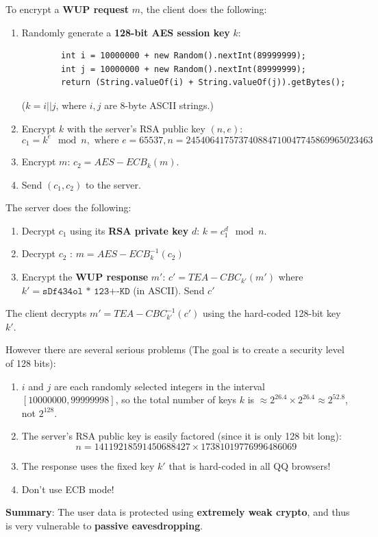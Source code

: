 \documentclass[12pt,titlepage]{article}
\begin{document}
To encrypt a \textbf{WUP request} $m$, the client does the following:\begin{enumerate}
	\item Randomly generate a \textbf{128-bit AES session key} $k$:\begin{verbatim}
		int i = 10000000 + new Random().nextInt(89999999);
		int j = 10000000 + new Random().nextInt(89999999);
		return (String.valueOf(i) + String.valueOf(j)).getBytes();
	\end{verbatim}
	($k = i||j$, where $i, j$ are 8-byte ASCII strings.)
	\item Encrypt $k$ with the server’s RSA public key $(n, e)$: $$c_1 = k^e \mod n, \text{ where } e = 65537, n=245406417573740884710047745869965023463$$
	\item Encrypt $m$: $c_2 = AES-ECB_k (m)$.
	\item Send $(c_1 , c_2 )$ to the server.
\end{enumerate}
The server does the following:\begin{enumerate}
	\item Decrypt $c_1$ using its \textbf{RSA private key} $d$: $k = c_1^d \mod n$.
	\item Decrypt $c_2$ : $m = AES-ECB^{-1}_k (c_2)$
	\item Encrypt the \textbf{WUP response} $m'$: $c' = TEA-CBC_{k'}(m')$ where $k' = \texttt{sDf434ol * 123+-KD}$ (in ASCII). Send $c'$
\end{enumerate}

The client decrypts $m'= TEA-CBC^{-1}_{k'} (c')$ using the hard-coded 128-bit key $k'$.

However there are several serious problems (The goal is to create a security level of 128 bits): \begin{enumerate}
	\item $i$ and $j$ are each randomly selected integers in the interval $[10000000, 99999998]$, so the total number of keys $k$ is $\approx 2^{26.4} \times 2^{26.4} \approx 2^{52.8}$, not $2^{128}$. 
	\item The server’s RSA public key is easily factored (since it is only 128 bit long):$$n = 14119218591450688427 \times 17381019776996486069$$
	\item The response uses the fixed key $k'$ that is hard-coded in all QQ browsers!
	\item Don’t use ECB mode!
\end{enumerate}

\textbf{Summary}: The user data is protected using \textbf{extremely weak crypto}, and thus is very vulnerable to \textbf{passive eavesdropping}.
\end{document}

